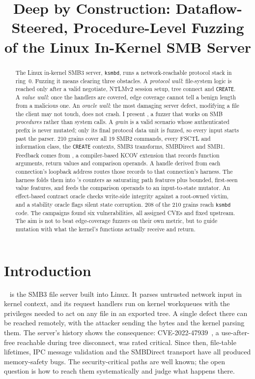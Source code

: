 \documentclass{article}
\title{Deep by Construction: Dataflow-Steered, Procedure-Level Fuzzing of the Linux In-Kernel SMB Server}
\date{}
\begin{document}
\maketitle

\begin{abstract}
The Linux in-kernel SMB3 server, \texttt{ksmbd}, runs a network-reachable
protocol stack in ring~0. Fuzzing it means clearing three obstacles. A
\emph{protocol wall}: file-system logic is reached only after a valid
negotiate, NTLMv2 session setup, tree connect and \texttt{CREATE}. A
\emph{value wall}: once the handlers are covered, edge coverage cannot tell a
benign length from a malicious one. An \emph{oracle wall}: the most damaging
server defect, modifying a file the client may not touch, does not crash. I
present \toolname, a fuzzer that works on SMB \emph{procedures} rather than
system calls. A \emph{grain} is a valid scenario whose authenticated prefix
is never mutated; only its final protocol data unit is fuzzed, so every input
starts past the parser. 210 grains cover all 19 SMB2 commands, every FSCTL
and information class, the \texttt{CREATE} contexts, SMB3 transforms,
SMBDirect and SMB1. Feedback comes from \kcovdf, a compiler-based KCOV
extension that records function arguments, return values and comparison
operands. A handle derived from each connection's loopback address routes
those records to that connection's harness. The harness folds them into
\libfuzzer's counters as saturating path features plus bounded, first-seen
value features, and feeds the comparison operands to an input-to-state
mutator. An effect-based contract oracle checks write-side integrity against
a root-owned victim, and a stability oracle flags silent state corruption.
208 of the 210 grains reach \texttt{ksmbd} code. The campaigns found six
vulnerabilities, all assigned CVEs and fixed upstream. The aim is not to beat
edge-coverage fuzzers on their own metric, but to guide mutation with what the
kernel's functions actually receive and return.
\end{abstract}



\section{Introduction}\label{sec:intro}

\ksmbd~\cite{ksmbddoc} is the SMB3 file server built into Linux. It parses
untrusted network input in kernel context, and its request handlers run on
kernel workqueues with the privileges needed to act on any file in an exported
tree. A single defect there can be reached remotely, with the attacker sending
the bytes and the kernel parsing them. The server's history shows the
consequence: CVE-2022-47939~\cite{cve202247939}, a use-after-free reachable
during tree disconnect, was rated critical. Since then, file-table
lifetimes, IPC message validation and the SMBDirect transport have all
produced memory-safety bugs. The security-critical paths are well known; the
open question is how to reach them systematically and judge what happens
there.
\end{document}
